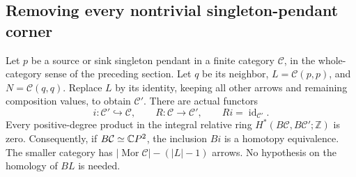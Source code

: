 \subsection{Removing every nontrivial singleton-pendant corner}

\begin{theorem}
\label{CP2:A-singleton-pendant-any-corner}
Let $p$ be a source or sink singleton pendant in a finite category
$\mathcal C$, in the whole-category sense of the preceding section.
Let $q$ be its neighbor, $L=\mathcal C(p,p)$, and
$N=\mathcal C(q,q)$. Replace $L$ by its identity, keeping all
other arrows and remaining composition values, to obtain
$\mathcal C'$. There are actual functors
\[
 i:\mathcal C'\hookrightarrow\mathcal C,
 \qquad R:\mathcal C\longrightarrow\mathcal C',
 \qquad Ri=\operatorname{id}_{\mathcal C'}.
\]
Every positive-degree product in the integral relative ring
$H^*(B\mathcal C,B\mathcal C';\mathbb Z)$ is zero.
Consequently, if $B\mathcal C\simeq\mathbb{C}P^2$, the inclusion
$Bi$ is a homotopy equivalence. The smaller category has
$|\operatorname{Mor}\mathcal C|-(|L|-1)$ arrows.
No hypothesis on the homology of $BL$ is needed.
\end{theorem}
